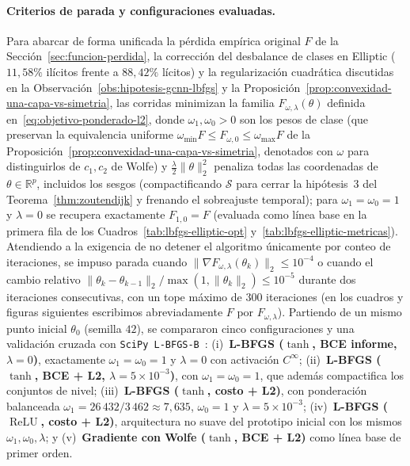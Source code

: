 \documentclass[a4paper,openany,oneside,10pt]{report}
\theoremstyle{pnlTeorema}
\theoremstyle{pnlDefinicion}
\theoremstyle{pnlObservacion}
\begin{document}
\paragraph{Criterios de parada y configuraciones evaluadas.}
Para abarcar de forma unificada la pérdida empírica original $F$ de la Sección~\ref{sec:funcion-perdida}, la corrección del desbalance de clases en Elliptic ($11{,}58\%$ ilícitos frente a $88{,}42\%$ lícitos) y la regularización cuadrática discutidas en la Observación~\ref{obs:hipotesis-gcnn-lbfgs} y la Proposición~\ref{prop:convexidad-una-capa-vs-simetria}, las corridas minimizan la familia $F_{\omega,\lambda}(\theta)$ definida en~\eqref{eq:objetivo-ponderado-l2}, donde $\omega_1,\omega_0>0$ son los pesos de clase (que preservan la equivalencia uniforme $\omega_{\min}F\le F_{\omega,0}\le\omega_{\max}F$ de la Proposición~\ref{prop:convexidad-una-capa-vs-simetria}, denotados con $\omega$ para distinguirlos de $c_1,c_2$ de Wolfe) y $\frac{\lambda}{2}\|\theta\|_2^2$ penaliza todas las coordenadas de $\theta\in\mathbb{R}^p$, incluidos los sesgos (compactificando $\mathcal{S}$ para cerrar la hipótesis~3 del Teorema~\ref{thm:zoutendijk} y frenando el sobreajuste temporal); para $\omega_1=\omega_0=1$ y $\lambda=0$ se recupera exactamente $F_{1,0}=F$ (evaluada como línea base en la primera fila de los Cuadros~\ref{tab:lbfgs-elliptic-opt} y~\ref{tab:lbfgs-elliptic-metricas}).
Atendiendo a la exigencia de no detener el algoritmo únicamente por conteo de
iteraciones, se impuso parada cuando $\|\nabla F_{\omega,\lambda}(\theta_k)\|_2\le 10^{-4}$ o
cuando el cambio relativo
$\|\theta_k-\theta_{k-1}\|_2/\max(1,\|\theta_k\|_2)\le 10^{-5}$ durante dos
iteraciones consecutivas, con un tope máximo de $300$ iteraciones (en los cuadros y figuras siguientes escribimos abreviadamente $F$ por $F_{\omega,\lambda}$). Partiendo de un
mismo punto inicial $\theta_0$ (semilla $42$), se compararon cinco
configuraciones y una validación cruzada con \texttt{SciPy L-BFGS-B}~\cite{byrd1995}:
(i)~\textbf{L-BFGS ($\tanh$, BCE informe, $\lambda=0$)}, exactamente $\omega_1=\omega_0=1$ y $\lambda=0$ con activación $C^\infty$;
(ii)~\textbf{L-BFGS ($\tanh$, BCE + L2, $\lambda=5\times 10^{-3}$)}, con $\omega_1=\omega_0=1$, que además
compactifica los conjuntos de nivel;
(iii)~\textbf{L-BFGS ($\tanh$, costo + L2)}, con ponderación balanceada
$\omega_1=26\,432/3\,462\approx 7{,}635$, $\omega_0=1$ y $\lambda=5\times 10^{-3}$;
(iv)~\textbf{L-BFGS ($\operatorname{ReLU}$, costo + L2)}, arquitectura no suave
del prototipo inicial con los mismos $\omega_1,\omega_0,\lambda$; y
(v)~\textbf{Gradiente con Wolfe ($\tanh$, BCE + L2)} como línea base de primer orden.
\end{document}
